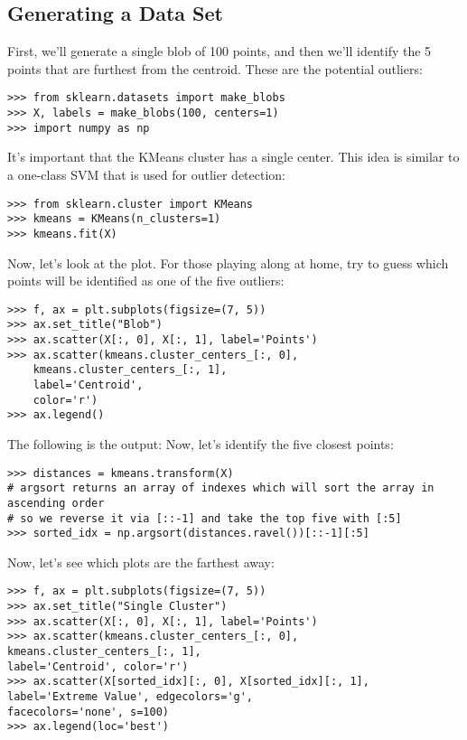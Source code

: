 \documentclass[SKL-MASTER.tex]{subfiles}
\begin{document}
\subsection*{Generating a Data Set}
First, we'll generate a single blob of 100 points, and then we'll identify the 5 points that are
furthest from the centroid. These are the potential outliers:
\begin{framed}
\begin{verbatim}
>>> from sklearn.datasets import make_blobs
>>> X, labels = make_blobs(100, centers=1)
>>> import numpy as np
\end{verbatim}
\end{framed}
It's important that the KMeans cluster has a single center. This idea is similar to a one-class
SVM that is used for outlier detection:
\begin{framed}
	\begin{verbatim}
>>> from sklearn.cluster import KMeans
>>> kmeans = KMeans(n_clusters=1)
>>> kmeans.fit(X)
\end{verbatim}
\end{framed}
Now, let's look at the plot. For those playing along at home, try to guess which points will be
identified as one of the five outliers:
\begin{framed}
	\begin{verbatim}
>>> f, ax = plt.subplots(figsize=(7, 5))
>>> ax.set_title("Blob")
>>> ax.scatter(X[:, 0], X[:, 1], label='Points')
>>> ax.scatter(kmeans.cluster_centers_[:, 0],
	kmeans.cluster_centers_[:, 1], 
    label='Centroid',
    color='r')
>>> ax.legend()
\end{verbatim}
\end{framed}
The following is the output:
Now, let's identify the five closest points:
\begin{framed}
	\begin{verbatim}
>>> distances = kmeans.transform(X)
# argsort returns an array of indexes which will sort the array in
ascending order
# so we reverse it via [::-1] and take the top five with [:5]
>>> sorted_idx = np.argsort(distances.ravel())[::-1][:5]
\end{verbatim}
\end{framed}
Now, let's see which plots are the farthest away:
\begin{framed}
	\begin{verbatim}
>>> f, ax = plt.subplots(figsize=(7, 5))
>>> ax.set_title("Single Cluster")
>>> ax.scatter(X[:, 0], X[:, 1], label='Points')
>>> ax.scatter(kmeans.cluster_centers_[:, 0],
kmeans.cluster_centers_[:, 1],
label='Centroid', color='r')
>>> ax.scatter(X[sorted_idx][:, 0], X[sorted_idx][:, 1],
label='Extreme Value', edgecolors='g',
facecolors='none', s=100)
>>> ax.legend(loc='best')
\end{verbatim}
\end{framed}
\end{document}
